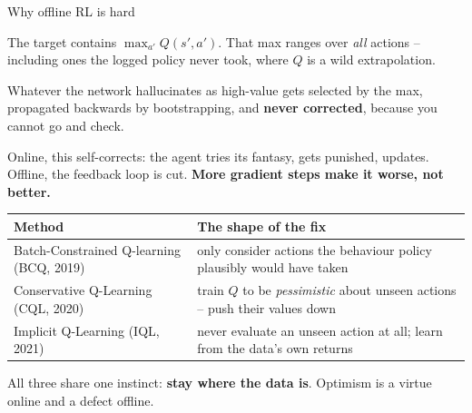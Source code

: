 \documentclass[aspectratio=169]{beamer}
\begin{document}
\begin{frame}{Why offline RL is hard}
  \begin{tcolorbox}[colback=armred!8, colframe=armred, boxrule=0.8pt, arc=2pt,
                    title={\textbf{Extrapolation error}}]
    \small
    The target contains $\max_{a'} Q(s',a')$. That max ranges over \emph{all} actions --
    including ones the logged policy never took, where $Q$ is a wild extrapolation.

    \vskip 4pt
    Whatever the network hallucinates as high-value gets selected by the max, propagated
    backwards by bootstrapping, and \textbf{never corrected}, because you cannot go and check.
  \end{tcolorbox}

  \vskip 5pt
  \footnotesize
  Online, this self-corrects: the agent tries its fantasy, gets punished, updates. Offline, the
  feedback loop is cut. \textbf{More gradient steps make it worse, not better.}

  \vskip 5pt
  \begin{center}
  \scriptsize
  \begin{tabular}{p{4.6cm} p{7.6cm}}
    \toprule
    \textbf{Method} & \textbf{The shape of the fix} \\
    \midrule
    Batch-Constrained Q-learning \newline (BCQ, 2019) & only consider actions the behaviour
      policy plausibly would have taken \\
    Conservative Q-Learning \newline (CQL, 2020) & train $Q$ to be \emph{pessimistic} about
      unseen actions -- push their values down \\
    Implicit Q-Learning \newline (IQL, 2021) & never evaluate an unseen action at all; learn
      from the data's own returns \\
    \bottomrule
  \end{tabular}
  \end{center}

  \vskip 4pt
  \begin{center}
    \footnotesize
    All three share one instinct: \textbf{stay where the data is}. Optimism is a virtue online
    and a defect offline.
  \end{center}
\end{frame}
\end{document}
